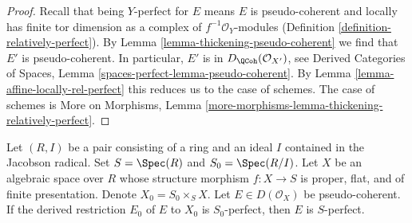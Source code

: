 \begin{proof}
Recall that being $Y$-perfect for $E$ means $E$ is
pseudo-coherent and locally has finite tor dimension as a complex
of $f^{-1}\mathcal{O}_Y$-modules
(Definition \ref{definition-relatively-perfect}).
By Lemma \ref{lemma-thickening-pseudo-coherent}
we find that $E'$ is pseudo-coherent.
In particular, $E'$ is in $D_\QCoh(\mathcal{O}_{X'})$, see
Derived Categories of Spaces, Lemma
\ref{spaces-perfect-lemma-pseudo-coherent}.
By Lemma \ref{lemma-affine-locally-rel-perfect}
this reduces us to the case of schemes.
The case of schemes is
More on Morphisms, Lemma
\ref{more-morphisms-lemma-thickening-relatively-perfect}.
\end{proof}

\begin{lemma}
\label{lemma-henselian-relatively-perfect}
Let $(R, I)$ be a pair consisting of a ring and an ideal $I$
contained in the Jacobson radical. Set $S = \Spec(R)$ and $S_0 = \Spec(R/I)$.
Let $X$ be an algebraic space over $R$ whose structure morphism
$f : X \to S$ is proper, flat, and of finite presentation.
Denote $X_0 = S_0 \times_S X$. Let $E \in D(\mathcal{O}_X)$
be pseudo-coherent. If the derived restriction $E_0$ of $E$
to $X_0$ is $S_0$-perfect, then $E$ is $S$-perfect.
\end{lemma}

